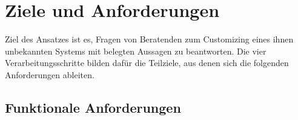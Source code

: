 
\section{Ziele und Anforderungen}
\label{sec:ziele-anforderungen}

Ziel des Ansatzes ist es, Fragen von Beratenden zum Customizing eines ihnen unbekannten Systems mit belegten Aussagen zu beantworten. Die vier Verarbeitungsschritte bilden dafür die Teilziele, aus denen sich die folgenden Anforderungen ableiten.

\subsection{Funktionale Anforderungen}
\label{subsec:anf-funktional}

